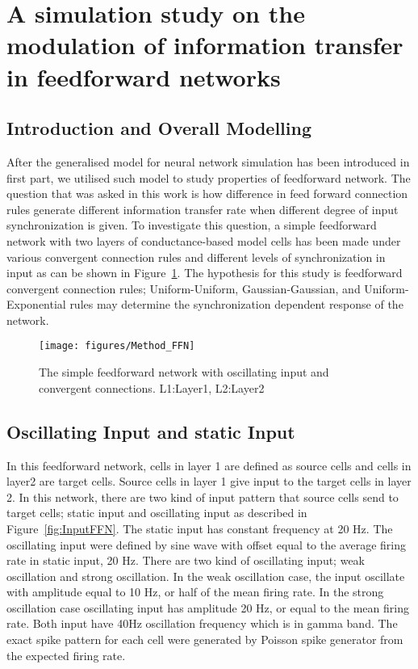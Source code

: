 \section{A simulation study on the modulation of information transfer in feedforward networks}

\subsection{Introduction and Overall Modelling}

After the generalised model for neural network simulation has been introduced in first part, we utilised such model to study properties of feedforward network. The question that was asked in this work is how difference in feed forward connection rules generate different information transfer rate when different degree of input synchronization is given. To investigate this question, a simple feedforward network with two layers of conductance-based model cells has been made under various convergent connection rules and different levels of synchronization in input as can be shown in Figure~\ref{fig:FFmodel}. The hypothesis for this study is feedforward convergent connection rules; Uniform-Uniform, Gaussian-Gaussian, and Uniform-Exponential rules may determine the synchronization dependent response of the network.
\begin{figure}[!h]
	\centering
	\texttt{[image: figures/Method\_FFN]}
	\caption{The simple feedforward network with oscillating input and convergent connections. L1:Layer1, L2:Layer2}
	\label{fig:FFmodel}
\end{figure} 

\subsection{Oscillating Input and static Input}
 In this feedforward network, cells in layer 1 are defined as source cells and cells in layer2 are target cells. Source cells in layer 1 give input to the target cells in layer 2. In this network, there are two kind of input pattern that source cells send to target cells; static input and oscillating input as described in Figure~\ref{fig:InputFFN}.  The static input has constant frequency at 20 Hz. The oscillating input were defined by sine wave with offset equal to the average firing rate in static input, 20 Hz. There are two kind of oscillating input; weak oscillation and strong oscillation. In the weak oscillation case, the input oscillate with amplitude equal to 10 Hz, or half of the mean firing rate. In the strong oscillation case oscillating input has amplitude 20 Hz, or equal to the mean firing rate. Both input have 40Hz oscillation frequency which is in gamma band.  The exact spike pattern for each cell were generated by Poisson spike generator from the expected firing rate.

